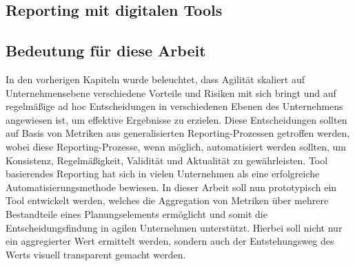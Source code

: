 \subsection{Reporting mit digitalen Tools}

\subsection{Bedeutung für diese Arbeit}
In den vorherigen Kapiteln wurde beleuchtet, dass Agilität skaliert auf Unternehmensebene verschiedene Vorteile und  Risiken mit sich bringt und auf regelmäßige ad hoc Entscheidungen in verschiedenen Ebenen des Unternehmens angewiesen ist, um effektive Ergebnisse zu erzielen. Diese Entscheidungen sollten auf Basis von Metriken aus generalisierten Reporting-Prozessen getroffen werden, wobei diese Reporting-Prozesse, wenn möglich, automatisiert werden sollten, um Konsistenz, Regelmäßigkeit, Validität und Aktualität zu gewährleisten. Tool basierendes Reporting hat sich in vielen Unternehmen als eine erfolgreiche Automatisierungsmethode bewiesen.
In dieser Arbeit soll nun prototypisch ein Tool entwickelt werden, welches die Aggregation von Metriken über mehrere Bestandteile eines Planungselements ermöglicht und somit die Entscheidungsfindung in agilen Unternehmen unterstützt. Hierbei soll nicht nur ein aggregierter Wert ermittelt werden, sondern auch der Entstehungsweg des Werts visuell transparent gemacht werden.
